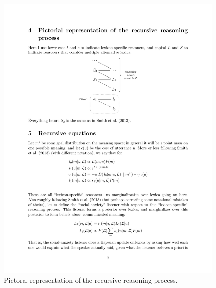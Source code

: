 \begin{figure}[htp]
  \centering
  \includegraphics[scale=1]{images/model}
  \caption{Pictoral representation of the recursive reasoning process.}
  \label{fig:model}
\end{figure}





